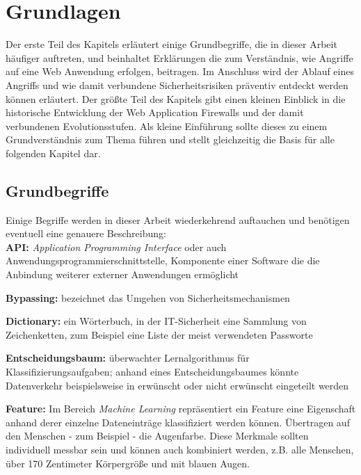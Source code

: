\chapter{Grundlagen}



Der erste Teil des Kapitels erläutert einige Grundbegriffe, die in dieser Arbeit häufiger auftreten, und beinhaltet Erklärungen die zum Verständnis, wie Angriffe auf eine Web Anwendung erfolgen, beitragen. Im Anschluss wird der Ablauf eines Angriffs und wie damit verbundene Sicherheitsrisiken präventiv entdeckt werden können erläutert. Der größte Teil des Kapitels gibt einen kleinen Einblick in die historische Entwicklung der Web Application Firewalls und der damit verbundenen Evolutionsstufen. Als kleine Einführung sollte dieses zu einem Grundverständnis zum Thema führen und stellt gleichzeitig die Basis für alle folgenden Kapitel dar.

\section{Grundbegriffe}
Einige Begriffe werden in dieser Arbeit wiederkehrend auftauchen und benötigen eventuell eine genauere Beschreibung:\\

\textbf{API:} \emph{Application Programming Interface} oder auch Anwendungsprogrammierschnittstelle, Komponente einer Software die die Anbindung weiterer externer Anwendungen ermöglicht

\textbf{Bypassing:} bezeichnet das Umgehen von Sicherheitsmechanismen

\textbf{Dictionary:} ein Wörterbuch, in der IT-Sicherheit eine Sammlung von Zeichenketten, zum Beispiel eine Liste der meist verwendeten Passworte

\textbf{Entscheidungsbaum:} überwachter Lernalgorithmus für Klassifizierungsaufgaben; anhand eines Entscheidungsbaumes könnte Datenverkehr beispielsweise in erwünscht oder nicht erwünscht eingeteilt werden

\textbf{Feature:} Im Bereich \emph{Machine Learning} repräsentiert ein Feature eine Eigenschaft anhand derer einzelne Dateneinträge klassifiziert werden können. Übertragen auf den Menschen - zum Beispiel - die Augenfarbe. Diese Merkmale sollten individuell messbar sein und können auch kombiniert werden, z.B. alle Menschen, über 170 Zentimeter Körpergröße und mit blauen Augen. 

